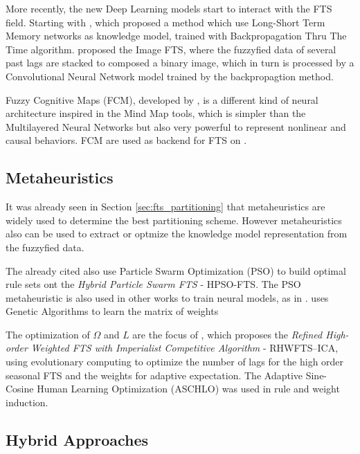 More recently, the new Deep Learning models start to interact with the FTS field. Starting with \cite{Tran2018}, which proposed a method which use Long-Short Term Memory networks as knowledge model, trained with Backpropagation Thru The Time algorithm. \cite{Sadaei2019} proposed the Image FTS, where the fuzzyfied data of several past lags are stacked to composed a binary image, which in turn is processed by a Convolutional Neural Network model trained by the backpropagtion method. 

Fuzzy Cognitive Maps (FCM), developed by \cite{Kosko1986}, is a different kind of neural architecture inspired in the Mind Map tools, which is simpler than the Multilayered Neural Networks but also very powerful to represent nonlinear and causal behaviors. FCM are used as backend for FTS on \cite{Homenda2014, Homenda2017, Yang2018c}. 

%
\subsection{Metaheuristics}
\label{sec:fts_evolutionary}

It was already seen in Section \ref{sec:fts_partitioning} that metaheuristics are widely used to determine the best partitioning scheme. However metaheuristics also can be used to extract or optmize the knowledge model representation from the fuzzyfied data.

The already cited \cite{Kuo2009} also use Particle Swarm Optimization (PSO) to build optimal rule sets ont the \textit{Hybrid Particle Swarm FTS} - HPSO-FTS. The PSO metaheuristic is also used in other works to train neural models, as in \cite{Bas2015, Yolcu2017, Bas2018}. \cite{Ye2016} uses Genetic Algorithms to learn the matrix of weights

The optimization of $\Omega$ and $L$ are the focus of \cite{Enayatifar2013}, which proposes the \textit{Refined High-order Weighted FTS with Imperialist Competitive Algorithm} - RHWFTS–ICA, using evolutionary computing to optimize the number of lags for the high order seasonal FTS and the weights for adaptive expectation. The Adaptive Sine-Cosine Human Learning Optimization (ASCHLO) was used in \cite{Yang2018} rule and weight induction.


%
\subsection{Hybrid Approaches}
\label{sec:fts_hybrid}

